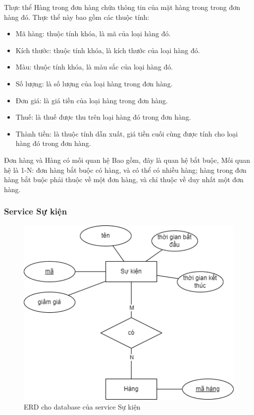 \par Thực thể Hàng trong đơn hàng chứa thông tin của mặt hàng trong trong đơn hàng đó. Thực thể này bao gồm các thuộc tính:
\begin{itemize}
    \item Mã hàng: thuộc tính khóa, là mã của loại hàng đó.
    \item Kích thước: thuộc tính khóa, là kích thước của loại hàng đó.
    \item Màu: thuộc tính khóa, là màu sắc của loại hàng đó.
    \item Số lượng: là số lượng của loại hàng trong đơn hàng.
    \item Đơn giá: là giá tiền của loại hàng trong đơn hàng.
    \item Thuế: là thuế được thu trên loại hàng đó trong đơn hàng.
    \item Thành tiền: là thuộc tính dẫn xuất, giá tiền cuối cùng được tính cho loại hàng đó trong đơn hàng.
\end{itemize}

\par Đơn hàng và Hàng có mối quan hệ Bao gồm, đây là quan hệ bắt buộc, Mối quan hệ là 1-N: đơn hàng bắt buộc có hàng, và có thể có nhiều hàng; hàng trong đơn hàng bắt buộc phải thuộc về một đơn hàng, và chỉ thuộc về duy nhất một đơn hàng.

\subsubsection{Service Sự kiện}
\begin{figure}[!htp]
    \begin{center}
        \includegraphics[width=1\textwidth]{img/database/erd/eerd-event.png}
        \newline
        \caption{ERD cho database của service Sự kiện}
    \end{center}
\end{figure}


